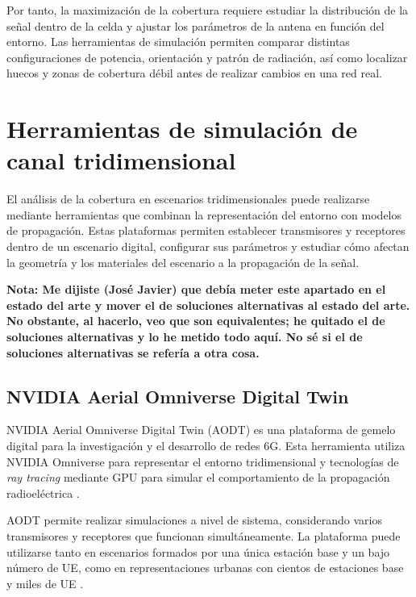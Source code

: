 Por tanto, la maximización de la cobertura requiere estudiar la distribución de la señal dentro de la celda y ajustar los parámetros de la antena en función del entorno. Las herramientas de simulación permiten comparar distintas configuraciones de potencia, orientación y patrón de radiación, así como localizar huecos y zonas de cobertura débil antes de realizar cambios en una red real.


\section{Herramientas de simulación de canal tridimensional}

El análisis de la cobertura en escenarios tridimensionales puede realizarse mediante herramientas que combinan la representación del entorno con modelos de propagación. Estas plataformas permiten establecer transmisores y receptores dentro de un escenario digital, configurar sus parámetros y estudiar cómo afectan la geometría y los materiales del escenario a la propagación de la señal.

\par\medskip
\textbf{Nota: Me dijiste (José Javier) que debía meter este apartado en el estado del arte y mover el de soluciones alternativas al estado del arte. No obstante, al hacerlo, veo que son equivalentes; he quitado el de soluciones alternativas y lo he metido todo aquí. No sé si el de soluciones alternativas se refería a otra cosa.}
\par\medskip

\subsection{NVIDIA Aerial Omniverse Digital Twin}

NVIDIA Aerial Omniverse Digital Twin (AODT) es una plataforma de gemelo digital para la investigación y el desarrollo de redes 6G. Esta herramienta utiliza NVIDIA Omniverse para representar el entorno tridimensional y tecnologías de \textit{ray tracing} mediante GPU para simular el comportamiento de la propagación radioeléctrica \cite{nvidia_aodt}.

AODT permite realizar simulaciones a nivel de sistema, considerando varios transmisores y receptores que funcionan simultáneamente. La plataforma puede utilizarse tanto en escenarios formados por una única estación base y un bajo número de UE, como en representaciones urbanas con cientos de estaciones base y miles de UE \cite{nvidia_aodt}.

